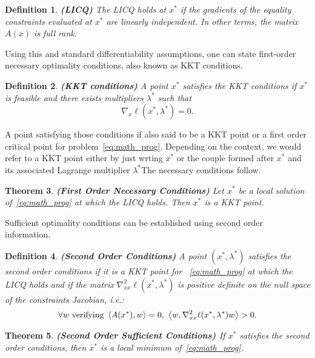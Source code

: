 \documentclass[10pt]{article}
\newtheorem{theorem}{Theorem}[]
\newtheorem{definition}[theorem]{Definition}
\numberwithin{equation}{section}
\begin{document}
	\begin{definition}\label{def:licq}
		\textbf{(LICQ)}
		The LICQ holds at $x^*$ if the gradients of the equality constraints evaluated at $x^*$ are linearly independent. In other terms, the matrix $A(x)$ is full rank.
	\end{definition}
	
	Using this and standard differentiability assumptions, one can state first-order necessary optimality conditions, also known as KKT conditions. 
	
	\begin{definition}\label{def:kkt_point}
		\textbf{(KKT conditions)}
		A point $x^*$ satisfies the KKT conditions if $x^* $ is feasible and there exists multipliers \(\lambda^*\) such that \[\nabla_x \ell (x^*,\lambda^*)=0.\]
	\end{definition}
	
	
	A point satisfying those conditions if also said to be a KKT point or a first order critical point for problem~\eqref{eq:math_prog}. Depending on the context, we would refer to a KKT point either by just wrting $x^*$ or the couple formed after $x^*$ and its associated Lagrange multiplier $\lambda^*$The necessary conditions follow.
	
	\begin{theorem}\label{theo:fonc}
		\textbf{(First Order Necessary Conditions)\cite[][Theorem 12.1]{nocedalwright:2006}}
		Let $x^*$ be a local solution of~\eqref{eq:math_prog} at which the LICQ holds. Then $x^*$ is a KKT point.
	\end{theorem}
	
	Sufficient optimality conditions can be established using second order information.
	
	\begin{definition}\label{def:soc}
		\textbf{(Second Order Conditions)}
		A point $(x^*,\lambda^*)$ satisfies the second order conditions if it is a KKT point for ~\eqref{eq:math_prog} at which the LICQ holds and if the matrix $\nabla_{xx}^2\ell(x^*,\lambda^*)$ is positive definite on the null space of the constraints Jacobian, i.e.:
		\[\forall w \text{ verifying } \left\langle {A(x^*)} , {w} \right\rangle=0,\ \left\langle {w} , {\nabla_{xx}^2\ell(x^*,\lambda^*)w} \right\rangle > 0.\]
	\end{definition}
	
	\begin{theorem} \textbf{(Second Order Sufficient Conditions) \cite[][Theorem 12.5]{nocedalwright:2006}}
		If $x^*$ satisfies the second order conditions, then $x^*$ is a local minimum of~\eqref{eq:math_prog}.
	\end{theorem}
	
\end{document}
